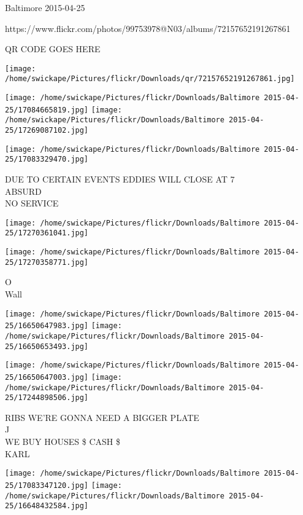 \documentclass[10pt,letterpaper]{article}
\begin{document}
Baltimore 2015-04-25

https://www.flickr.com/photos/99753978@N03/albums/72157652191267861

QR CODE GOES HERE

\texttt{[image: /home/swickape/Pictures/flickr/Downloads/qr/72157652191267861.jpg]}
\pagebreak

\texttt{[image: /home/swickape/Pictures/flickr/Downloads/Baltimore 2015-04-25/17084665819.jpg]}
\texttt{[image: /home/swickape/Pictures/flickr/Downloads/Baltimore 2015-04-25/17269087102.jpg]}

\texttt{[image: /home/swickape/Pictures/flickr/Downloads/Baltimore 2015-04-25/17083329470.jpg]}

DUE TO CERTAIN EVENTS EDDIES WILL CLOSE AT 7\\
ABSURD\\
NO SERVICE\\
\pagebreak

\texttt{[image: /home/swickape/Pictures/flickr/Downloads/Baltimore 2015-04-25/17270361041.jpg]}

\vspace{0.25in}
\texttt{[image: /home/swickape/Pictures/flickr/Downloads/Baltimore 2015-04-25/17270358771.jpg]}

O\\
Wall\\
\pagebreak

\texttt{[image: /home/swickape/Pictures/flickr/Downloads/Baltimore 2015-04-25/16650647983.jpg]}
\texttt{[image: /home/swickape/Pictures/flickr/Downloads/Baltimore 2015-04-25/16650653493.jpg]}

\texttt{[image: /home/swickape/Pictures/flickr/Downloads/Baltimore 2015-04-25/16650647003.jpg]}
\texttt{[image: /home/swickape/Pictures/flickr/Downloads/Baltimore 2015-04-25/17244898506.jpg]}

RIBS WE'RE GONNA NEED A BIGGER PLATE\\
J\\
WE BUY HOUSES \$ CASH \$\\
KARL\\
\pagebreak

\texttt{[image: /home/swickape/Pictures/flickr/Downloads/Baltimore 2015-04-25/17083347120.jpg]}
\texttt{[image: /home/swickape/Pictures/flickr/Downloads/Baltimore 2015-04-25/16648432584.jpg]}
\end{document}
